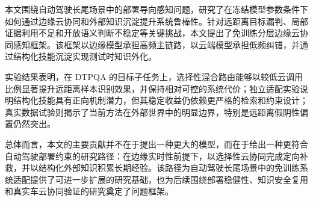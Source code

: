 本文围绕自动驾驶长尾场景中的部署导向感知问题，研究了在冻结模型参数条件下如何通过边缘云协同和外部知识沉淀提升系统鲁棒性。针对远距离目标漏判、局部证据利用不足和开放语义判断不稳定等关键挑战，本文提出了免训练分层边缘云协同感知框架。该框架以边缘模型承担高频主链路，以云端模型承担低频纠错，并通过结构化技能沉淀实现测试时知识外化。

实验结果表明，在 DTPQA 的目标子任务上，选择性混合路由能够以较低云调用比例显著提升远距离样本识别效果，并保持相对可控的系统代价；独立适配实验说明结构化技能具有正向机制潜力，但其稳定收益仍依赖更严格的检索和约束设计；真实数据试验则揭示了当前方法在外部世界中的明显边界，特别是远距离假阴性偏置仍然突出。

总体而言，本文的主要贡献并不在于提出一种更大的模型，而在于给出一种更符合自动驾驶部署约束的研究路径：在边缘实时性前提下，以选择性云协同完成定向补救，并以结构化外部知识积累长期经验。该路径为自动驾驶长尾场景中的免训练系统适配提供了可进一步扩展的研究基础，也为后续围绕部署稳健性、知识安全复用和真实车云协同验证的研究奠定了问题框架。
